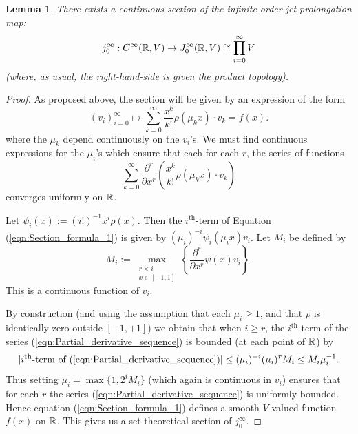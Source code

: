 \documentclass{article}
\newtheorem{lemma}[theorem]{Lemma}
\newtheorem{proposed work}[theorem]{Proposed Work}
\begin{document}
\begin{lemma}
	There exists a continuous section of the infinite order jet prolongation map:
	\begin{equation*}
		j^\infty_0: C^\infty(\mathbb R, V) \to J_0^\infty(\mathbb R, V) \cong \prod_{i=0}^\infty V
	\end{equation*}
	(where, as usual, the right-hand-side is given the product topology).
\end{lemma}

\begin{proof}
	As proposed above, the section will be given by an expression of the form
	\begin{equation} \label{eqn:Section_formula_1}
		(v_i)_{i=0}^\infty \mapsto \sum_{k=0}^\infty \frac{x^k}{k!} \rho(\mu_k x) \cdot v_k = f(x).
	\end{equation}
	where the $\mu_k$ depend continuously on the $v_i$'s. 
	We must find continuous expressions for the $\mu_i$'s which ensure that each for each $r$, the series of functions
	\begin{equation} \label{eqn:Partial_derivative_sequence}
		\sum_{k=0}^\infty \frac{\partial^r}{\partial x^r} \left( \frac{x^k}{k!} \rho(\mu_k x) \cdot v_k \right)
	\end{equation}
	converges uniformly on $\mathbb R$. 
	
	Let $\psi_i(x) := (i!)^{-1} x^i \rho(x)$. Then the $i^\textrm{th}$-term of Equation (\ref{eqn:Section_formula_1}) is given by $(\mu_i)^{-i} \psi_i(\mu_ix) v_i$. Let $M_i$ be defined by
	\begin{equation*}
		M_i := \max_{\substack{r < i \\ x \in [-1,1]}} \left\{ \frac{\partial^r}{\partial x^r} \psi(x) v_i \right\}.
	\end{equation*}
	This is a continuous function of $v_i$. 
	
	By construction (and using the assumption that each $\mu_i \geq 1$, and that $\rho$ is identically zero outside $[-1,+1]$) we obtain that when $i \geq r$, the $i^\textrm{th}$-term of the series (\ref{eqn:Partial_derivative_sequence}) is bounded (at each point of $\mathbb R$) by 
	\begin{equation*}
		|i^\textrm{th}\textrm{-term of (\ref{eqn:Partial_derivative_sequence})}| \leq (\mu_i)^{-i} (\mu_i)^r M_i \leq M_i \mu_i^{-1}. 
	\end{equation*}
	Thus setting $\mu_i = \max \{1, 2^i M_i \}$ (which again is continuous in $v_i$) ensures that for each $r$ the series (\ref{eqn:Partial_derivative_sequence}) is uniformly bounded. Hence equation (\ref{eqn:Section_formula_1}) defines a smooth $V$-valued function $f(x)$ on $\mathbb R$. This gives us a set-theoretical section of $j^\infty_0$. 
	

\end{proof}
\end{document}
